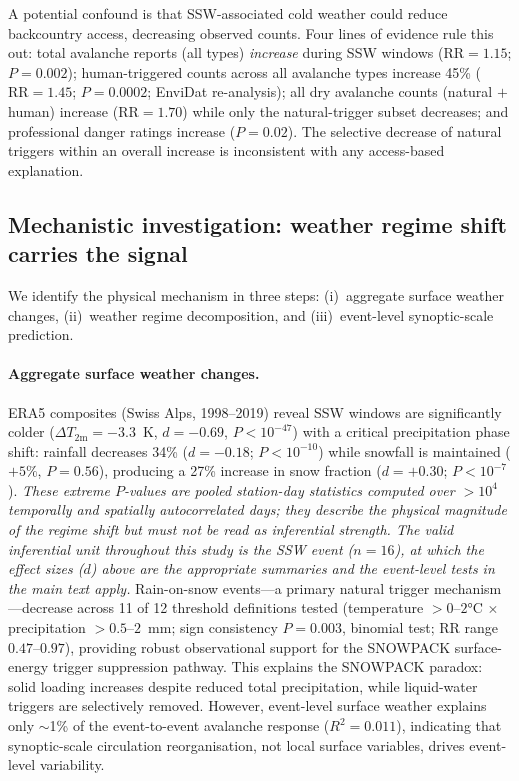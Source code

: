 \documentclass[11pt,letterpaper]{article}
\begin{document}
A potential confound is that SSW-associated cold weather could reduce backcountry access, decreasing observed counts. Four lines of evidence rule this out: total avalanche reports (all types) \emph{increase} during SSW windows ($\mathrm{RR} = 1.15$; $P = 0.002$); human-triggered counts across all avalanche types increase 45\% ($\mathrm{RR} = 1.45$; $P = 0.0002$; EnviDat re-analysis); all dry avalanche counts (natural $+$ human) increase ($\mathrm{RR} = 1.70$) while only the natural-trigger subset decreases; and professional danger ratings increase ($P = 0.02$). The selective decrease of natural triggers within an overall increase is inconsistent with any access-based explanation.

\subsection*{Mechanistic investigation: weather regime shift carries the signal}

We identify the physical mechanism in three steps: (i)~aggregate surface weather changes, (ii)~weather regime decomposition, and (iii)~event-level synoptic-scale prediction.

\paragraph{Aggregate surface weather changes.} ERA5 composites (Swiss Alps, 1998--2019) reveal SSW windows are significantly colder ($\Delta T_{2\mathrm{m}} = -3.3$~K, $d = -0.69$, $P < 10^{-47}$) with a critical precipitation phase shift: rainfall decreases 34\% ($d = -0.18$; $P < 10^{-10}$) while snowfall is maintained ($+5\%$, $P = 0.56$), producing a 27\% increase in snow fraction ($d = +0.30$; $P < 10^{-7}$). \emph{These extreme $P$-values are pooled station-day statistics computed over $>10^{4}$ temporally and spatially autocorrelated days; they describe the physical magnitude of the regime shift but must not be read as inferential strength. The valid inferential unit throughout this study is the SSW event ($n = 16$), at which the effect sizes ($d$) above are the appropriate summaries and the event-level tests in the main text apply.} Rain-on-snow events---a primary natural trigger mechanism---decrease across 11 of 12 threshold definitions tested (temperature $> 0$--$2$°C $\times$ precipitation $> 0.5$--$2$~mm; sign consistency $P = 0.003$, binomial test; RR range $0.47$--$0.97$), providing robust observational support for the SNOWPACK surface-energy trigger suppression pathway. This explains the SNOWPACK paradox: solid loading increases despite reduced total precipitation, while liquid-water triggers are selectively removed. However, event-level surface weather explains only $\sim$1\% of the event-to-event avalanche response ($R^2 = 0.011$), indicating that synoptic-scale circulation reorganisation, not local surface variables, drives event-level variability.
\end{document}

